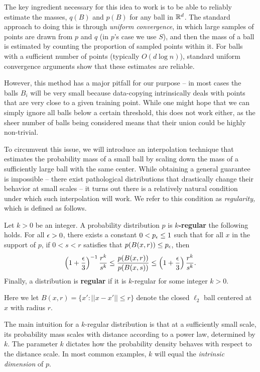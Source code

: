 The key ingredient necessary for this idea to work is to be able to reliably estimate the masses, $q(B)$ and $p(B)$ for any ball in $\mathbb{R}^d$. The standard approach to doing this is through \textit{uniform convergence}, in which large samples of points are drawn from $p$ and $q$ (in $p$'s case we use $S$), and then the mass of a ball is estimated by counting the proportion of sampled points within it. For balls with a sufficient number of points (typically $O( d\log n)$), standard uniform convergence arguments show that these estimates are reliable.

However, this method has a major pitfall for our purpose -- in most cases the balls $B_i$ will be very small because data-copying intrinsically deals with points that are very close to a given training point. While one might hope that we can simply ignore all balls below a certain threshold, this does not work either, as the sheer number of balls being considered means that their union could be highly non-trivial. 

To circumvent this issue, we will introduce an interpolation technique that estimates the probability mass of a small ball by scaling down the mass of a sufficiently large ball with the same center. While obtaining a general guarantee is impossible -- there exist pathological  distributions that drastically change their behavior at small scales -- it turns out there is a relatively natural condition under which such interpolation will work. We refer to this condition as \textit{regularity,} which is defined as follows.

\begin{definition}\label{def:regular}
Let $k> 0$ be an integer. A probability distribution $p$ is \textbf{$k$-regular} the following holds. For all $\epsilon > 0$, there exists a constant $0 < p_\epsilon \leq 1$ such that for all $x$ in the support of $p$, if $0 < s < r$ satisfies that $p(B(x, r)) \leq p_\epsilon$, then $$\left(1+\frac{\epsilon}{3}\right)^{-1}\frac{r^k}{s^{k}} \leq \frac{p(B(x, r))}{p(B(x, s))} \leq \left(1+\frac{\epsilon}{3}\right)\frac{r^k}{s^{k}}.$$ Finally, a distribution is \textbf{regular} if it is $k$-regular for some integer $k > 0$. 
\end{definition}

Here we let $B(x, r) = \{x': ||x - x'|| \leq r\}$ denote the closed $\ell_2$ ball centered at $x$ with radius $r$. 

The main intuition for a $k$-regular distribution is that at a sufficiently small scale, its probability mass scales with distance according to a power law, determined by $k$. The parameter $k$ dictates how the probability density behaves with respect to the distance scale. In most common examples, $k$ will equal the \textit{intrinsic dimension}  of $p$.

